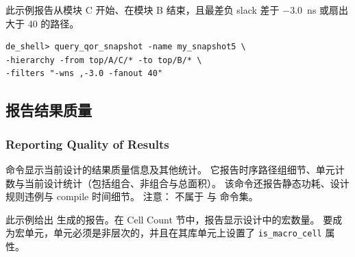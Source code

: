 此示例报告从模块 C 开始、在模块 B 结束，且最差负 slack 差于 $-3.0$~ns 或扇出大于 40 的路径。

\begin{lstlisting}[caption={按 WNS 与扇出报告经过指定模块的路径},label=ex:qor-wns-fanout]
de_shell> query_qor_snapshot -name my_snapshot5 \
-hierarchy -from top/A/C/* -to top/B/* \
-filters "-wns ,-3.0 -fanout 40"
\end{lstlisting}

\subsection{报告结果质量}
\subsubsection*{Reporting Quality of Results}

 命令显示当前设计的结果质量信息及其他统计。
它报告时序路径组细节、单元计数与当前设计统计（包括组合、非组合与总面积）。
该命令还报告静态功耗、设计规则违例与 compile 时间细节。
注意： 不属于  与  命令集。

此示例给出 \cmd{report\_qor} 生成的报告。在 Cell Count 节中，报告显示设计中的宏数量。
要成为宏单元，单元必须是非层次的，并且在其库单元上设置了 \texttt{is\_macro\_cell} 属性。

